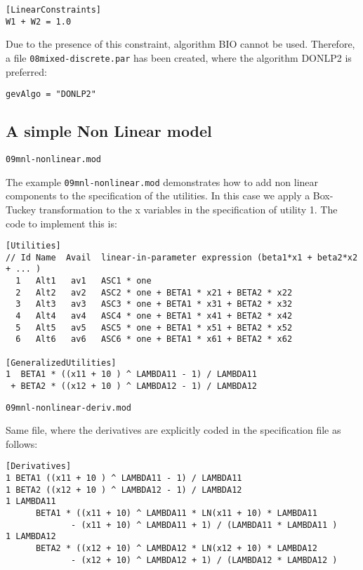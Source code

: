 \documentclass[12pt]{memoir}
\begin{document}
{\footnotesize
\begin{verbatim}
[LinearConstraints]
W1 + W2 = 1.0
\end{verbatim}
}

Due to the presence of this constraint, algorithm BIO cannot be used. Therefore, a file \verb+08mixed-discrete.par+ has been created, where the algorithm DONLP2 is preferred:
{\footnotesize
\begin{verbatim}
gevAlgo = "DONLP2"
\end{verbatim}
}

\subsection{A simple Non Linear model}
\begin{flushright}
\verb+09mnl-nonlinear.mod+
\end{flushright}

The example \verb+09mnl-nonlinear.mod+ demonstrates how to add non linear components to the 
specification of the utilities. In this case we apply a Box-Tuckey transformation to the x
variables in the specification of utility 1.  The code to implement this is:

\footnotesize
{\footnotesize
\begin{verbatim}
[Utilities]
// Id Name  Avail  linear-in-parameter expression (beta1*x1 + beta2*x2 + ... )
  1   Alt1   av1   ASC1 * one 
  2   Alt2   av2   ASC2 * one + BETA1 * x21 + BETA2 * x22
  3   Alt3   av3   ASC3 * one + BETA1 * x31 + BETA2 * x32
  4   Alt4   av4   ASC4 * one + BETA1 * x41 + BETA2 * x42
  5   Alt5   av5   ASC5 * one + BETA1 * x51 + BETA2 * x52
  6   Alt6   av6   ASC6 * one + BETA1 * x61 + BETA2 * x62

[GeneralizedUtilities]
1  BETA1 * ((x11 + 10 ) ^ LAMBDA11 - 1) / LAMBDA11 
 + BETA2 * ((x12 + 10 ) ^ LAMBDA12 - 1) / LAMBDA12
\end{verbatim}
}
\normalsize

\begin{flushright}
\verb+09mnl-nonlinear-deriv.mod+
\end{flushright}

Same file, where the derivatives are explicitly coded in the specification file as follows:

\footnotesize
{\footnotesize
\begin{verbatim}
[Derivatives]
1 BETA1 ((x11 + 10 ) ^ LAMBDA11 - 1) / LAMBDA11
1 BETA2 ((x12 + 10 ) ^ LAMBDA12 - 1) / LAMBDA12
1 LAMBDA11 
      BETA1 * ((x11 + 10) ^ LAMBDA11 * LN(x11 + 10) * LAMBDA11 
             - (x11 + 10) ^ LAMBDA11 + 1) / (LAMBDA11 * LAMBDA11 )
1 LAMBDA12 
      BETA2 * ((x12 + 10) ^ LAMBDA12 * LN(x12 + 10) * LAMBDA12 
             - (x12 + 10) ^ LAMBDA12 + 1) / (LAMBDA12 * LAMBDA12 )
\end{verbatim}
}
\normalsize
\end{document}
